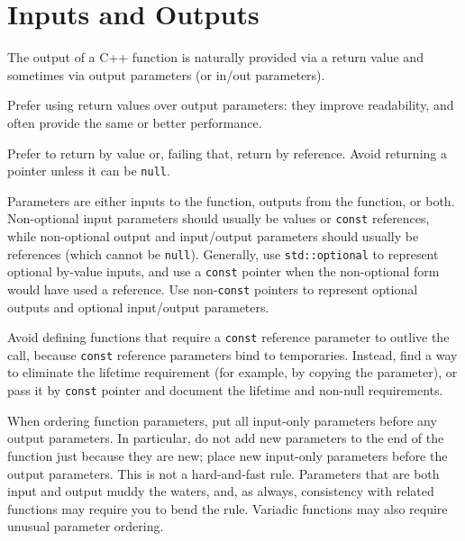 
\section{Inputs and Outputs}\label{sec:inputs-and-outputs}
The output of a C++ function is naturally provided via a return value and sometimes via output parameters (or in/out parameters).

Prefer using return values over output parameters: they improve readability, and often provide the same or better performance.

Prefer to return by value or, failing that, return by reference. Avoid returning a pointer unless it can be \texttt{null}.

Parameters are either inputs to the function, outputs from the function, or both. Non-optional input parameters should usually be values or \texttt{const} references, while non-optional output and input/output parameters should usually be references (which cannot be \texttt{null}). Generally, use \texttt{std::optional} to represent optional by-value inputs, and use a \texttt{const} pointer when the non-optional form would have used a reference. Use non-\texttt{const} pointers to represent optional outputs and optional input/output parameters.

Avoid defining functions that require a \texttt{const} reference parameter to outlive the call, because \texttt{const} reference parameters bind to temporaries. Instead, find a way to eliminate the lifetime requirement (for example, by copying the parameter), or pass it by \texttt{const} pointer and document the lifetime and non-null requirements.

When ordering function parameters, put all input-only parameters before any output parameters. In particular, do not add new parameters to the end of the function just because they are new; place new input-only parameters before the output parameters. This is not a hard-and-fast rule. Parameters that are both input and output muddy the waters, and, as always, consistency with related functions may require you to bend the rule. Variadic functions may also require unusual parameter ordering.
